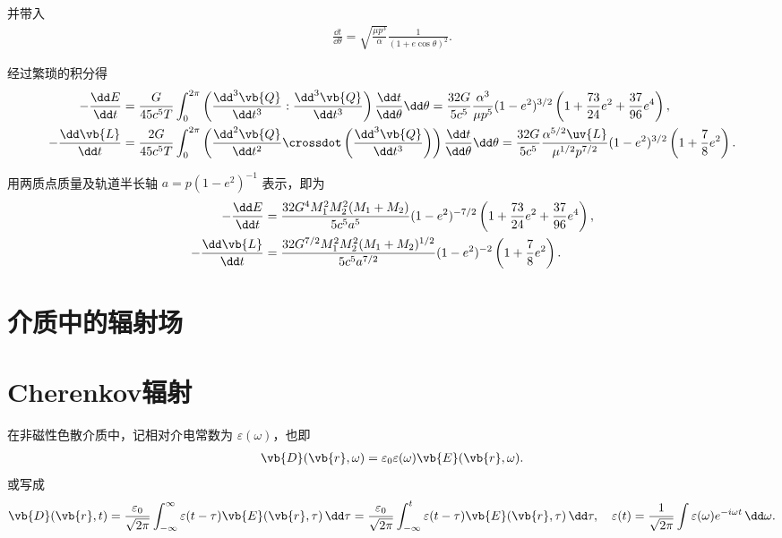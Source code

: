 \begin{note}
	并带入
	\begin{align*}
		\frac{\dd t}{\dd \theta} = \sqrt{\frac{\mu p^3}{\alpha}} \frac{1}{(1 + e\cos\theta)^2}.
	\end{align*}

	经过繁琐的积分得
	\begin{align*}
		-\frac{\dd E}{\dd t} &= \frac{G}{45 c^5 T} \int_{0}^{2\pi} \left( \frac{\dd^3\vb{Q}}{\dd t^3} : \frac{\dd^3\vb{Q}}{\dd t^3} \right) \frac{\dd t}{\dd \theta} \dd \theta
		= \frac{32 G}{5 c^5} \frac{\alpha^3}{\mu p^5} (1 - e^2)^{3/2} \left( 1 + \frac{73}{24}e^2 + \frac{37}{96}e^4 \right), \\
		-\frac{\dd \vb{L}}{\dd t} &= \frac{2 G}{45 c^5 T} \int_{0}^{2\pi} \left( \frac{\dd^2\vb{Q}}{\dd t^2} \crossdot \left( \frac{\dd^3\vb{Q}}{\dd t^3} \right) \right) \frac{\dd t}{\dd \theta} \dd \theta
		= \frac{32 G}{5 c^5} \frac{\alpha^{5/2} \uv{L}}{\mu^{1/2} p^{7/2}} (1 - e^2)^{3/2} \left( 1 + \frac{7}{8}e^2 \right).
	\end{align*}

	用两质点质量及轨道半长轴 \(a = p(1-e^2)^{-1}\) 表示，即为
	\begin{align*}
		-\frac{\dd E}{\dd t} &= \frac{32 G^4 M_1^2 M_2^2 (M_1 + M_2)}{5 c^5 a^5} (1 - e^2)^{-7/2} \left( 1 + \frac{73}{24}e^2 + \frac{37}{96}e^4 \right), \\
		-\frac{\dd \vb{L}}{\dd t} &= \frac{32 G^{7/2} M_1^2 M_2^2 (M_1 + M_2)^{1/2}}{5 c^5 a^{7/2}} (1 - e^2)^{-2} \left( 1 + \frac{7}{8}e^2 \right).
	\end{align*}

\end{note}

\section{介质中的辐射场}
\section{Cherenkov辐射}
在非磁性色散介质中，记相对介电常数为 \(\varepsilon(\omega)\)，也即
\begin{align*}
	\vb{D}(\vb{r},\omega) = \varepsilon_{0} \varepsilon(\omega) \vb{E}(\vb{r},\omega).
\end{align*}
或写成
\begin{align*}
	\vb{D}(\vb{r},t) = \frac{\varepsilon_{0}}{\sqrt{2\pi}} \int_{-\infty}^{\infty} \varepsilon(t-\tau) \vb{E}(\vb{r},\tau) \, \dd \tau = \frac{\varepsilon_{0}}{\sqrt{2\pi}} \int_{-\infty}^{t} \varepsilon(t-\tau) \vb{E}(\vb{r},\tau) \, \dd \tau, \quad \varepsilon(t) = \frac{1}{\sqrt{2\pi}} \int \varepsilon(\omega) e^{-i\omega t} \, \dd \omega.
\end{align*}

